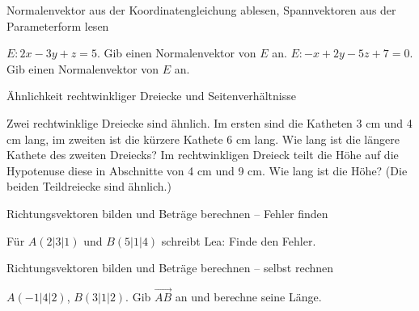 \begin{aufgabe}{Normalenvektor aus der Koordinatengleichung ablesen, Spannvektoren aus der Parameterform lesen}
\begin{teile}
\teil $E\colon 2x - 3y + z = 5$. Gib einen Normalenvektor von $E$ an. \leerfeld
\teil $E\colon -x + 2y - 5z + 7 = 0$. Gib einen Normalenvektor von $E$ an. \leerfeld
\end{teile}
\end{aufgabe}

\begin{aufgabe}{Ähnlichkeit rechtwinkliger Dreiecke und Seitenverhältnisse}
\begin{teile}
\teil Zwei rechtwinklige Dreiecke sind ähnlich. Im ersten sind die Katheten 3 cm und 4 cm lang, im zweiten ist die kürzere Kathete 6 cm lang. Wie lang ist die längere Kathete des zweiten Dreiecks? \leerfeld[cm]
\teil Im rechtwinkligen Dreieck teilt die Höhe auf die Hypotenuse diese in Abschnitte von 4 cm und 9 cm. Wie lang ist die Höhe? (Die beiden Teildreiecke sind ähnlich.) \leerfeld[cm]
\end{teile}
\end{aufgabe}

\begin{aufgabe}{Richtungsvektoren bilden und Beträge berechnen – Fehler finden}
\begin{teile}
\teil Für $A(2 | 3 | 1)$ und $B(5 | 1 | 4)$ schreibt Lea:  Finde den Fehler.
\end{teile}
\end{aufgabe}

\begin{aufgabe}{Richtungsvektoren bilden und Beträge berechnen – selbst rechnen}
\begin{teile}
\teil $A(-1 | 4 | 2)$, $B(3 | 1 | 2)$. Gib $\overrightarrow{AB}$ an und berechne seine Länge. \leerfeld
\end{teile}
\end{aufgabe}
